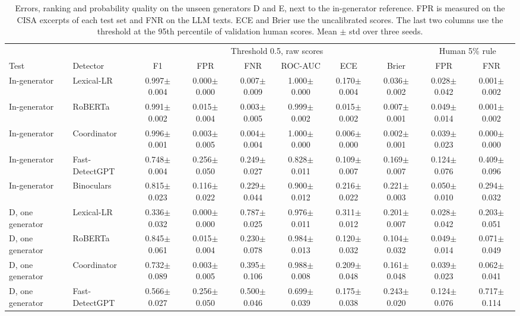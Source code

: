 \begin{table}[t]
\centering
\scriptsize\setlength{\tabcolsep}{2.5pt}
\caption{Errors, ranking and probability quality on the unseen generators D and E, next to the in-generator reference. FPR is measured on the CISA excerpts of each test set and FNR on the LLM texts. ECE and Brier use the uncalibrated scores. The last two columns use the threshold at the 95th percentile of validation human scores. Mean $\pm$ std over three seeds.}
\label{tab:newgen}
\begin{tabular}{@{}llcccccccc@{}}
\toprule
 & & \multicolumn{6}{c}{Threshold 0.5, raw scores} & \multicolumn{2}{c}{Human 5\% rule} \\
\cmidrule(lr){3-8}\cmidrule(lr){9-10}
Test & Detector & F1 & FPR & FNR & ROC-AUC & ECE & Brier & FPR & FNR \\
\midrule
In-generator & Lexical-LR & 0.997$\pm$0.004 & 0.000$\pm$0.000 & 0.007$\pm$0.009 & 1.000$\pm$0.000 & 0.170$\pm$0.004 & 0.036$\pm$0.002 & 0.028$\pm$0.042 & 0.001$\pm$0.002 \\
In-generator & RoBERTa & 0.991$\pm$0.002 & 0.015$\pm$0.004 & 0.003$\pm$0.005 & 0.999$\pm$0.002 & 0.015$\pm$0.002 & 0.007$\pm$0.001 & 0.049$\pm$0.014 & 0.001$\pm$0.002 \\
In-generator & Coordinator & 0.996$\pm$0.001 & 0.003$\pm$0.005 & 0.004$\pm$0.004 & 1.000$\pm$0.000 & 0.006$\pm$0.000 & 0.002$\pm$0.001 & 0.039$\pm$0.023 & 0.000$\pm$0.000 \\
In-generator & Fast-DetectGPT & 0.748$\pm$0.004 & 0.256$\pm$0.050 & 0.249$\pm$0.027 & 0.828$\pm$0.011 & 0.109$\pm$0.007 & 0.169$\pm$0.007 & 0.124$\pm$0.076 & 0.409$\pm$0.096 \\
In-generator & Binoculars & 0.815$\pm$0.023 & 0.116$\pm$0.022 & 0.229$\pm$0.044 & 0.900$\pm$0.012 & 0.216$\pm$0.022 & 0.221$\pm$0.003 & 0.050$\pm$0.010 & 0.294$\pm$0.032 \\
D, one generator & Lexical-LR & 0.336$\pm$0.032 & 0.000$\pm$0.000 & 0.787$\pm$0.025 & 0.976$\pm$0.011 & 0.311$\pm$0.012 & 0.201$\pm$0.007 & 0.028$\pm$0.042 & 0.203$\pm$0.051 \\
D, one generator & RoBERTa & 0.845$\pm$0.061 & 0.015$\pm$0.004 & 0.230$\pm$0.078 & 0.984$\pm$0.013 & 0.120$\pm$0.032 & 0.104$\pm$0.032 & 0.049$\pm$0.014 & 0.071$\pm$0.049 \\
D, one generator & Coordinator & 0.732$\pm$0.089 & 0.003$\pm$0.005 & 0.395$\pm$0.106 & 0.988$\pm$0.008 & 0.209$\pm$0.048 & 0.161$\pm$0.048 & 0.039$\pm$0.023 & 0.062$\pm$0.041 \\
D, one generator & Fast-DetectGPT & 0.566$\pm$0.027 & 0.256$\pm$0.050 & 0.500$\pm$0.046 & 0.699$\pm$0.039 & 0.175$\pm$0.038 & 0.243$\pm$0.020 & 0.124$\pm$0.076 & 0.717$\pm$0.114 \\

\end{tabular}
\end{table}
